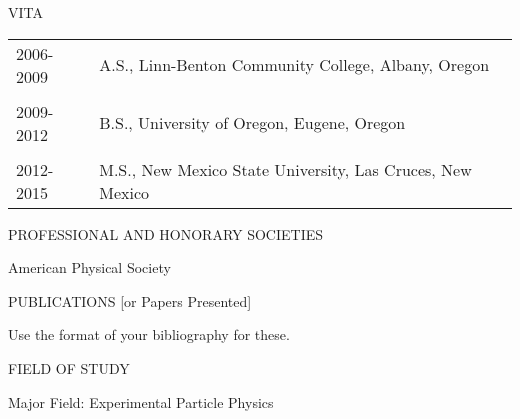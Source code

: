 \begin{center}
            VITA
\end{center}
\begin{flushleft}
\begin{tabular}{ll}
2006-2009        &  A.S., Linn-Benton Community College, Albany, Oregon
\\
& \\
2009-2012        &  B.S., University of Oregon, Eugene, Oregon
\\
& \\
2012-2015        &  M.S., New Mexico State University, Las Cruces, New Mexico
\end{tabular}
\end{flushleft}
\vspace{0.1in}
\begin{center}
PROFESSIONAL  AND HONORARY SOCIETIES
\end{center}
\begin{flushleft}
American Physical Society
\end{flushleft}
\vspace{0.1in}
\begin{center}PUBLICATIONS [or Papers Presented]
\end{center}
Use the format of your bibliography for these.
\begin{center}
FIELD OF STUDY
\end{center}
\begin{flushleft}
Major Field: Experimental Particle Physics
\end{flushleft}

\newpage
